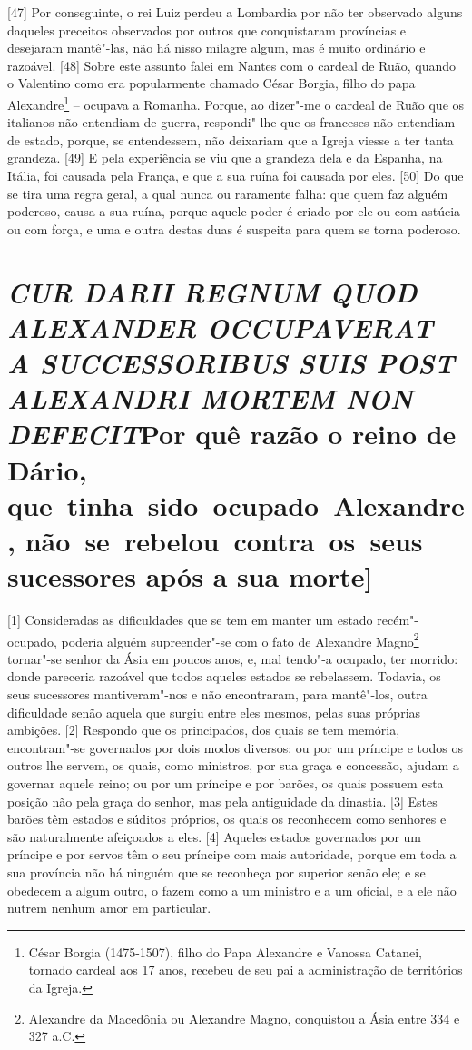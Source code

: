 {[}47{]} Por conseguinte, o rei Luiz perdeu a Lombardia por não ter
observado alguns daqueles preceitos observados por outros que
conquistaram províncias e desejaram mantê"-las, não há nisso milagre
algum, mas é muito ordinário e razoável. {[}48{]} Sobre este assunto
falei em Nantes com o cardeal de Ruão, quando o Valentino como era
popularmente chamado César Borgia, filho do papa Alexandre\footnote{César
  Borgia (1475-1507), filho do Papa Alexandre  e Vanossa Catanei,
  tornado cardeal aos 17 anos, recebeu de seu pai a administração de
  territórios da Igreja.} -- ocupava a Romanha. Porque, ao dizer"-me o
cardeal de Ruão que os italianos não entendiam de guerra, respondi"-lhe
que os franceses não entendiam de estado, porque, se entendessem, não
deixariam que a Igreja viesse a ter tanta grandeza. {[}49{]} E pela
experiência se viu que a grandeza dela e da Espanha, na Itália, foi
causada pela França, e que a sua ruína foi causada por eles. {[}50{]} Do
que se tira uma regra geral, a qual nunca ou raramente falha: que quem
faz alguém poderoso, causa a sua ruína, porque aquele poder é criado por
ele ou com astúcia ou com força, e uma e outra destas duas é suspeita
para quem se torna poderoso.

\quebra\section{\emph{CUR DARII REGNUM QUOD ALEXANDER OCCUPAVERAT A SUCCESSORIBUS SUIS
POST ALEXANDRI MORTEM NON DEFECIT}\break {[}Por quê razão o reino de Dário, que~tinha~sido~ocupado~Alexandre, não~se~rebelou~contra~os~seus sucessores após a sua morte{]}}

{[}1{]} Consideradas as dificuldades que se tem em manter um estado
recém"-ocupado, poderia alguém supreender"-se com o fato de Alexandre
Magno\footnote{Alexandre da Macedônia ou Alexandre Magno, conquistou a
  Ásia entre 334 e 327 a.C.} tornar"-se senhor da Ásia em poucos anos, e,
mal tendo"-a ocupado, ter morrido: donde pareceria razoável que todos
aqueles estados se rebelassem. Todavia, os seus sucessores
mantiveram"-nos e não encontraram, para mantê"-los, outra dificuldade
senão aquela que surgiu entre eles mesmos, pelas suas próprias ambições.
{[}2{]} Respondo que os principados, dos quais se tem memória,
encontram"-se governados por dois modos diversos: ou por um príncipe e
todos os outros lhe servem, os quais, como ministros, por sua graça e
concessão, ajudam a governar aquele reino; ou por um príncipe e por
barões, os quais possuem esta posição não pela graça do senhor, mas pela
antiguidade da dinastia. {[}3{]} Estes barões têm estados e súditos
próprios, os quais os reconhecem como senhores e são naturalmente
afeiçoados a eles. {[}4{]} Aqueles estados governados por um príncipe e
por servos têm o seu príncipe com mais autoridade, porque em toda a sua
província não há ninguém que se reconheça por superior senão ele; e se
obedecem a algum outro, o fazem como a um ministro e a um oficial, e a
ele não nutrem nenhum amor em particular.

